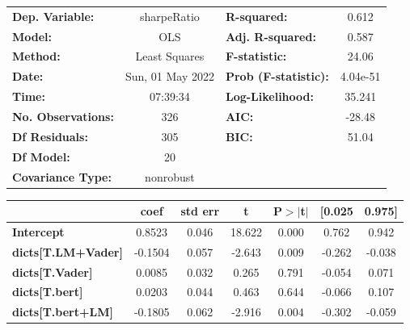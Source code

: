 \begin{center}
\begin{tabular}{lclc}
\toprule
\textbf{Dep. Variable:}              &   sharpeRatio    & \textbf{  R-squared:         } &     0.612   \\
\textbf{Model:}                      &       OLS        & \textbf{  Adj. R-squared:    } &     0.587   \\
\textbf{Method:}                     &  Least Squares   & \textbf{  F-statistic:       } &     24.06   \\
\textbf{Date:}                       & Sun, 01 May 2022 & \textbf{  Prob (F-statistic):} &  4.04e-51   \\
\textbf{Time:}                       &     07:39:34     & \textbf{  Log-Likelihood:    } &    35.241   \\
\textbf{No. Observations:}           &         326      & \textbf{  AIC:               } &    -28.48   \\
\textbf{Df Residuals:}               &         305      & \textbf{  BIC:               } &     51.04   \\
\textbf{Df Model:}                   &          20      & \textbf{                     } &             \\
\textbf{Covariance Type:}            &    nonrobust     & \textbf{                     } &             \\
\bottomrule
\end{tabular}
\begin{tabular}{lcccccc}
                                     & \textbf{coef} & \textbf{std err} & \textbf{t} & \textbf{P$> |$t$|$} & \textbf{[0.025} & \textbf{0.975]}  \\
\midrule
\textbf{Intercept}                   &       0.8523  &        0.046     &    18.622  &         0.000        &        0.762    &        0.942     \\
\textbf{dicts[T.LM+Vader]}           &      -0.1504  &        0.057     &    -2.643  &         0.009        &       -0.262    &       -0.038     \\
\textbf{dicts[T.Vader]}              &       0.0085  &        0.032     &     0.265  &         0.791        &       -0.054    &        0.071     \\
\textbf{dicts[T.bert]}               &       0.0203  &        0.044     &     0.463  &         0.644        &       -0.066    &        0.107     \\
\textbf{dicts[T.bert+LM]}            &      -0.1805  &        0.062     &    -2.916  &         0.004        &       -0.302    &       -0.059     \\

\end{tabular}
\end{center}
